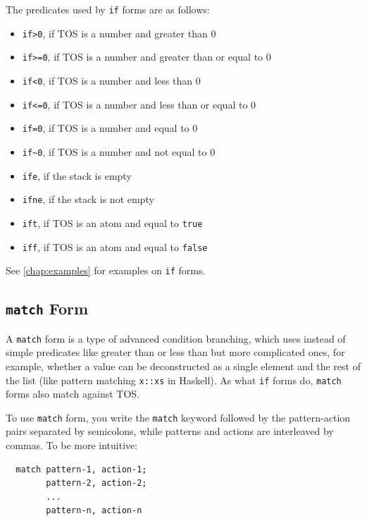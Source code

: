 \documentclass{book}
\begin{document}
The predicates used by \texttt{if} forms are as follows:
\begin{itemize}
\item \texttt{if>0}, if TOS is a number and greater than 0
\item \texttt{if>=0}, if TOS is a number and greater than or equal to 0
\item \texttt{if<0}, if TOS is a number and less than 0
\item \texttt{if<=0}, if TOS is a number and less than or equal to 0
\item \texttt{if=0}, if TOS is a number and equal to 0
\item \texttt{if\textasciitilde 0}, if TOS is a number and not equal to 0
\item \texttt{ife}, if the stack is empty
\item \texttt{ifne}, if the stack is not empty
\item \texttt{ift}, if TOS is an atom and equal to \texttt{true}
\item \texttt{iff}, if TOS is an atom and equal to \texttt{false}
\end{itemize}

See \autoref{chap:examples} for examples on \texttt{if} forms.

\subsection{\texttt{match} Form}
\label{ssec:match}

A \texttt{match} form is a type of advanced condition branching, which uses instead of simple predicates like greater than or less than but more complicated ones, for example, whether a value can be deconstructed as a single element and the rest of the list (like pattern matching \texttt{x::xs} in Haskell). As what \texttt{if} forms do, \texttt{match} forms also match against TOS.

To use \texttt{match} form, you write the \texttt{match} keyword followed by the pattern-action pairs separated by semicolons, while patterns and actions are interleaved by commas. To be more intuitive:
\begin{verbatim}
  match pattern-1, action-1;
        pattern-2, action-2;
        ...
        pattern-n, action-n
\end{verbatim}
\end{document}

